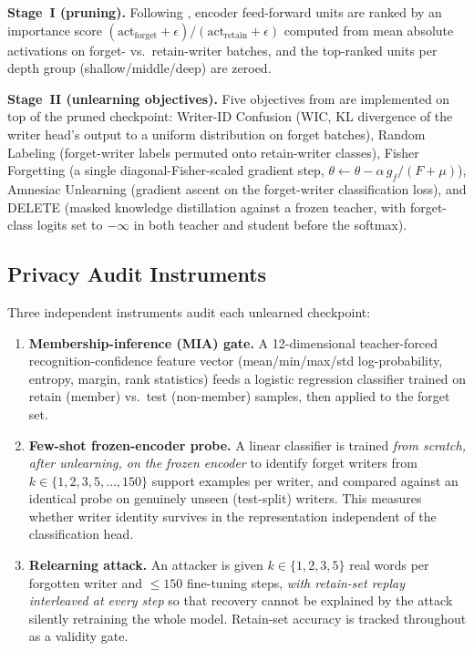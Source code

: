 \documentclass[a4paper,fleqn]{cas-dc}
\begin{document}
\textbf{Stage~I (pruning).} Following \citet{kang2026privacy}, encoder
feed-forward units are ranked by an importance score
$(\mathrm{act}_{\text{forget}}+\epsilon)/(\mathrm{act}_{\text{retain}}+\epsilon)$
computed from mean absolute activations on forget- vs.\ retain-writer
batches, and the top-ranked units per depth group (shallow/middle/deep) are
zeroed.

\textbf{Stage~II (unlearning objectives).} Five objectives from
\citet{kang2026privacy} are implemented on top of the pruned checkpoint:
Writer-ID Confusion (WIC, KL divergence of the writer head's output to a
uniform distribution on forget batches), Random Labeling (forget-writer
labels permuted onto retain-writer classes), Fisher Forgetting (a single
diagonal-Fisher-scaled gradient step, $\theta \leftarrow \theta - \alpha\,
g_f/(F+\mu)$), Amnesiac Unlearning (gradient ascent on the forget-writer
classification loss), and DELETE (masked knowledge distillation against a
frozen teacher, with forget-class logits set to $-\infty$ in both teacher
and student before the softmax).

\subsection{Privacy Audit Instruments}
\label{sec:audit}

Three independent instruments audit each unlearned checkpoint:

\begin{enumerate}
\item \textbf{Membership-inference (MIA) gate.} A 12-dimensional
  teacher-forced recognition-confidence feature vector (mean/min/max/std
  log-probability, entropy, margin, rank statistics) feeds a logistic
  regression classifier trained on retain (member) vs.\ test (non-member)
  samples, then applied to the forget set.
\item \textbf{Few-shot frozen-encoder probe.} A linear classifier is
  trained \emph{from scratch, after unlearning, on the frozen encoder} to
  identify forget writers from $k \in \{1,2,3,5,\ldots,150\}$ support
  examples per writer, and compared against an identical probe on
  genuinely unseen (test-split) writers. This measures whether writer
  identity survives in the representation independent of the
  classification head.
\item \textbf{Relearning attack.} An attacker is given $k \in \{1,2,3,5\}$
  real words per forgotten writer and $\leq 150$ fine-tuning steps,
  \emph{with retain-set replay interleaved at every step} so that recovery
  cannot be explained by the attack silently retraining the whole model.
  Retain-set accuracy is tracked throughout as a validity gate.
\end{enumerate}
\end{document}
